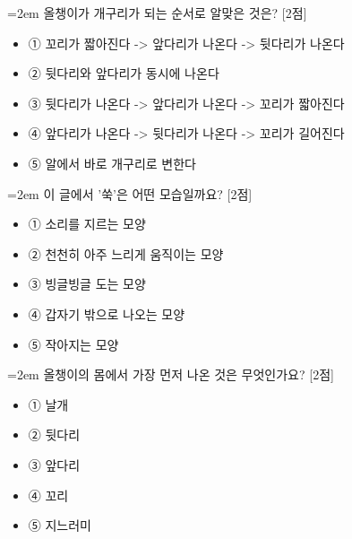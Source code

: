 \documentclass[12pt,a4paper]{article}
\newcommand{\qnum}[1]{%
  \tikz[baseline=(num.base)]{%
    \node[circle, fill=numCircle, text=white, inner sep=0pt,
          minimum size=18pt, font=\small\bfseries] (num) {#1};%
  }%
}
\newcommand{\pts}[1]{%
  \hfill\textcolor{ptsBadge}{[#1점]}%
}
\begin{document}
\vspace{4mm}
\begin{samepage}
{\hangindent=2em
\qnum{4}\enspace 올챙이가 개구리가 되는 순서로 알맞은 것은? \pts{2}
\par}

\vspace{3mm}
\begin{itemize}[leftmargin=2.5em, labelsep=0.3em, label={}, itemsep=4pt, parsep=1pt, topsep=0pt]
  \item ① 꼬리가 짧아진다 -> 앞다리가 나온다 -> 뒷다리가 나온다
  \item ② 뒷다리와 앞다리가 동시에 나온다
  \item ③ 뒷다리가 나온다 -> 앞다리가 나온다 -> 꼬리가 짧아진다
  \item ④ 앞다리가 나온다 -> 뒷다리가 나온다 -> 꼬리가 길어진다
  \item ⑤ 알에서 바로 개구리로 변한다
\end{itemize}
\end{samepage}

\vspace{4mm}
\begin{samepage}
{\hangindent=2em
\qnum{5}\enspace 이 글에서 '쑥'은 어떤 모습일까요? \pts{2}
\par}

\vspace{3mm}
\begin{itemize}[leftmargin=2.5em, labelsep=0.3em, label={}, itemsep=4pt, parsep=1pt, topsep=0pt]
  \item ① 소리를 지르는 모양
  \item ② 천천히 아주 느리게 움직이는 모양
  \item ③ 빙글빙글 도는 모양
  \item ④ 갑자기 밖으로 나오는 모양
  \item ⑤ 작아지는 모양
\end{itemize}
\end{samepage}

\vspace{4mm}
\begin{samepage}
{\hangindent=2em
\qnum{6}\enspace 올챙이의 몸에서 가장 먼저 나온 것은 무엇인가요? \pts{2}
\par}

\vspace{3mm}
\begin{itemize}[leftmargin=2.5em, labelsep=0.3em, label={}, itemsep=4pt, parsep=1pt, topsep=0pt]
  \item ① 날개
  \item ② 뒷다리
  \item ③ 앞다리
  \item ④ 꼬리
  \item ⑤ 지느러미
\end{itemize}
\end{samepage}
\end{document}

